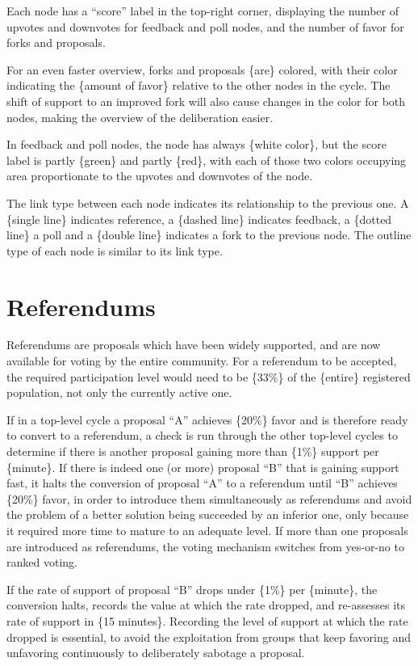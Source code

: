 \documentclass[a4paper,11pt]{article}
\begin{document}
\begin{multicols}{2}
Each node has a “score” label in the top-right corner, displaying the number of upvotes and downvotes for feedback and poll nodes, and the number of favor for forks and proposals. 

For an even faster overview, forks and proposals \{are\} colored, with their color indicating the \{amount of favor\} relative to the other nodes in the cycle. The shift of support to an improved fork will also cause changes in the color for both nodes, making the overview of the deliberation easier.

In feedback and poll nodes, the node has always \{white color\}, but the score label is partly \{green\} and partly \{red\}, with each of those two colors occupying area proportionate to the upvotes and downvotes of the node.

The link type between each node indicates its relationship to the previous one. A \{single line\} indicates reference, a \{dashed line\} indicates feedback, a \{dotted line\} a poll and a \{double line\} indicates a fork to the previous node. The outline type of each node is similar to its link type.

\section{Referendums} \label{referendums}

Referendums are proposals which have been widely supported, and are now available for voting by the entire community. For a referendum to be accepted, the required participation level would need to be \{33\%\} of the \{entire\} registered population, not only the currently active one.

If in a top-level cycle a proposal “A” achieves \{20\%\} favor and is therefore ready to convert to a referendum, a check is run through the other top-level cycles to determine if there is another proposal gaining more than \{1\%\} support per \{minute\}. If there is indeed one (or more) proposal “B” that is gaining support fast, it halts the conversion of proposal “A” to a referendum until “B” achieves \{20\%\} favor, in order to introduce them simultaneously as referendums and avoid the problem of a better solution being succeeded by an inferior one, only because it required more time to mature to an adequate level. If more than one proposals are introduced as referendums, the voting mechanism switches from yes-or-no to ranked voting.

If the rate of support of proposal “B” drops under \{1\%\} per \{minute\}, the conversion halts, records the value at which the rate dropped, and re-assesses its rate of support in \{15 minutes\}. Recording the level of support at which the rate dropped is essential, to avoid the exploitation from groups that keep favoring and unfavoring continuously to deliberately sabotage a proposal.


\end{multicols}
\end{document}
